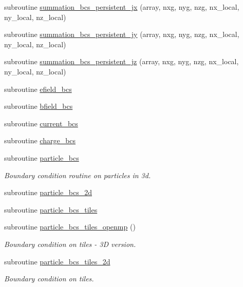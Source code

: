 \begin{DoxyCompactItemize}
\item 
subroutine \hyperlink{namespaceboundary_ac7114eb91bced14ba975f1467fb2db08}{summation\+\_\+bcs\+\_\+persistent\+\_\+jx} (array, nxg, nyg, nzg, nx\+\_\+local, ny\+\_\+local, nz\+\_\+local)
\item 
subroutine \hyperlink{namespaceboundary_ac7a1a01d802cba6dd53260db0cb76a93}{summation\+\_\+bcs\+\_\+persistent\+\_\+jy} (array, nxg, nyg, nzg, nx\+\_\+local, ny\+\_\+local, nz\+\_\+local)
\item 
subroutine \hyperlink{namespaceboundary_ad2325e9a68255f71d1cafcee47b1ff9a}{summation\+\_\+bcs\+\_\+persistent\+\_\+jz} (array, nxg, nyg, nzg, nx\+\_\+local, ny\+\_\+local, nz\+\_\+local)
\item 
subroutine \hyperlink{namespaceboundary_a2397a80ea9511ae3266ad16c668cc547}{efield\+\_\+bcs}
\item 
subroutine \hyperlink{namespaceboundary_af2316f12b3b85debc7214c4c47035322}{bfield\+\_\+bcs}
\item 
subroutine \hyperlink{namespaceboundary_a2bd382bbf256b1208d4fd3721c37ad08}{current\+\_\+bcs}
\item 
subroutine \hyperlink{namespaceboundary_a0b6d77029b51dd2a0e853c265885ab6c}{charge\+\_\+bcs}
\item 
subroutine \hyperlink{namespaceboundary_a9e7ba00d025d595683607b3ccd95bcb3}{particle\+\_\+bcs}
\begin{DoxyCompactList}\small\item\em Boundary condition routine on particles in 3d. \end{DoxyCompactList}\item 
subroutine \hyperlink{namespaceboundary_aad89819169dca0b0ae8cf04748a86fb1}{particle\+\_\+bcs\+\_\+2d}
\item 
subroutine \hyperlink{namespaceboundary_added6cf2ea0ffc7ab618c3d9af16fade}{particle\+\_\+bcs\+\_\+tiles}
\item 
subroutine \hyperlink{namespaceboundary_af6d7a140eef6818609e44869b67cd3a7}{particle\+\_\+bcs\+\_\+tiles\+\_\+openmp} ()
\begin{DoxyCompactList}\small\item\em Boundary condition on tiles -\/ 3D version. \end{DoxyCompactList}\item 
subroutine \hyperlink{namespaceboundary_afb4e6ab09e288dab2bb9ce2d731e276f}{particle\+\_\+bcs\+\_\+tiles\+\_\+2d}
\begin{DoxyCompactList}\small\item\em Boundary condition on tiles. \end{DoxyCompactList}\item 

\end{DoxyCompactItemize}
